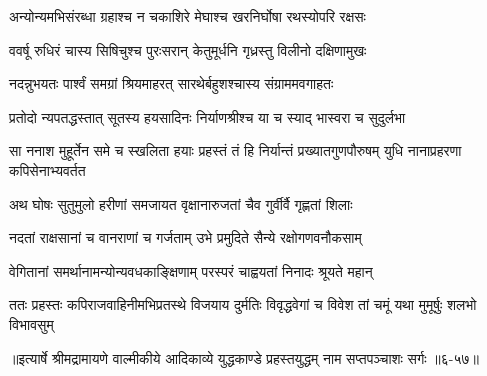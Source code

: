 \twolineshloka
{अन्योन्यमभिसंरब्धा ग्रहाश्च न चकाशिरे}
{मेघाश्च खरनिर्घोषा रथस्योपरि रक्षसः} %

\twolineshloka
{ववर्षू रुधिरं चास्य सिषिचुश्च पुरःसरान्}
{केतुमूर्धनि गृध्रस्तु विलीनो दक्षिणामुखः} %

\twolineshloka
{नदन्नुभयतः पार्श्वं समग्रां श्रियमाहरत्}
{सारथेर्बहुशश्चास्य संग्राममवगाहतः} %

\twolineshloka
{प्रतोदो न्यपतद्धस्तात् सूतस्य हयसादिनः}
{निर्याणश्रीश्च या च स्याद् भास्वरा च सुदुर्लभा} %

\threelineshloka
{सा ननाश मुहूर्तेन समे च स्खलिता हयाः}
{प्रहस्तं तं हि निर्यान्तं प्रख्यातगुणपौरुषम्}
{युधि नानाप्रहरणा कपिसेनाभ्यवर्तत} %

\twolineshloka
{अथ घोषः सुतुमुलो हरीणां समजायत}
{वृक्षानारुजतां चैव गुर्वीर्वै गृह्णतां शिलाः} %

\twolineshloka
{नदतां राक्षसानां च वानराणां च गर्जताम्}
{उभे प्रमुदिते सैन्ये रक्षोगणवनौकसाम्} %

\twolineshloka
{वेगितानां समर्थानामन्योन्यवधकाङ्क्षिणाम्}
{परस्परं चाह्वयतां निनादः श्रूयते महान्} %

\twolineshloka
{ततः प्रहस्तः कपिराजवाहिनीमभिप्रतस्थे विजयाय दुर्मतिः}
{विवृद्धवेगां च विवेश तां चमूं यथा मुमूर्षुः शलभो विभावसुम्} %


॥इत्यार्षे श्रीमद्रामायणे वाल्मीकीये आदिकाव्ये युद्धकाण्डे प्रहस्तयुद्धम् नाम सप्तपञ्चाशः सर्गः ॥६-५७॥
